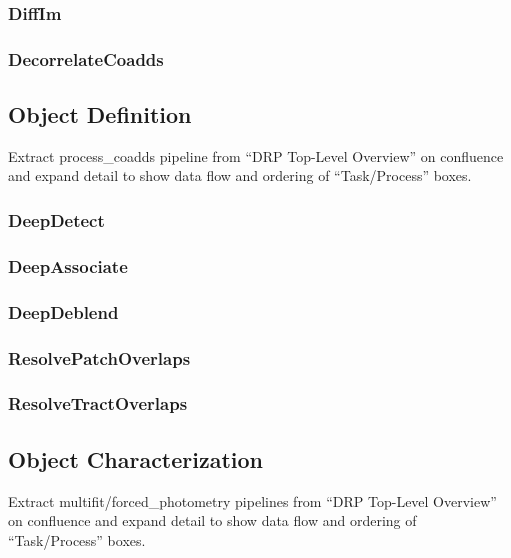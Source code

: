 \subsubsection{DiffIm}
\label{sec:drpDiffIm}
\subsubsection{DecorrelateCoadds}
\label{sec:drpDecorrelateCoadds}

\subsection{Object Definition}
\label{sec:drp_object_definition}

\begin{note}
Extract process\_coadds pipeline from ``DRP Top-Level Overview'' on confluence and expand detail to show data flow and ordering of ``Task/Process'' boxes.
\end{note}

\subsubsection{DeepDetect}
\label{sec:drpDeepDetect}
\subsubsection{DeepAssociate}
\label{sec:drpDeepAssociate}
\subsubsection{DeepDeblend}
\label{sec:drpDeepDeblend}
\subsubsection{ResolvePatchOverlaps}
\label{sec:drpResolvePatchOverlaps}
\subsubsection{ResolveTractOverlaps}
\label{sec:drpResolveTractOverlaps}

\subsection{Object Characterization}
\label{sec:drp_object_characterization}

\begin{note}
Extract multifit/forced\_photometry pipelines from ``DRP Top-Level Overview'' on confluence and expand detail to show data flow and ordering of ``Task/Process'' boxes.
\end{note}

